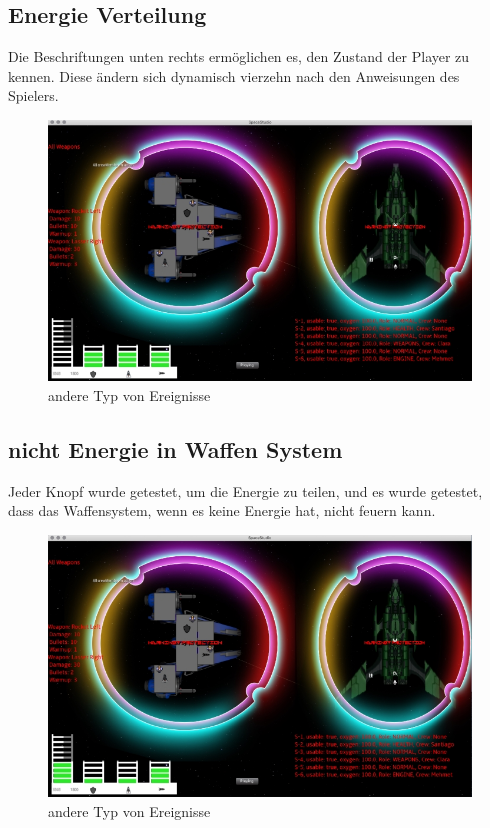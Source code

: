 \documentclass[12pt]{article}
\begin{document}
\newpage
\subsection{Energie Verteilung}
Die Beschriftungen unten rechts ermöglichen es, den Zustand der Player zu kennen. Diese ändern sich dynamisch vierzehn nach den Anweisungen des Spielers.
\begin{figure}[htp]
\centering
\includegraphics[scale=0.7]{TestProtocolBilder/OptimizedEnergieAlleSysteme.png}
\caption{andere Typ von Ereignisse}
\end{figure}

\newpage
\subsection{nicht Energie in  Waffen System}
Jeder Knopf wurde getestet, um die Energie zu teilen, und es wurde getestet, dass das Waffensystem, wenn es keine Energie hat, nicht feuern kann.
\begin{figure}[htp]
\centering
\includegraphics[scale=0.7]{TestProtocolBilder/OptimizedEnergieVerteilung.png}
\caption{andere Typ von Ereignisse}
\end{figure}
\end{document}
